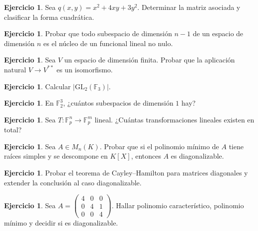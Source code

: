 \documentclass[10pt,a4paper,oneside]{article}
\theoremstyle{plain}
\theoremstyle{definition}
\newtheorem{exercise}[theorem]{Ejercicio}
\theoremstyle{remark}
\newcommand{\F}{\mathbb{F}}
\newcommand{\GL}{\mathrm{GL}}
\begin{document}
\begin{exercise}
Sea \(q(x,y)=x^2+4xy+3y^2\). Determinar la matriz asociada y clasificar la forma cuadrática.
\end{exercise}
\begin{exercise}
Probar que todo subespacio de dimensión \(n-1\) de un espacio de dimensión \(n\) es el núcleo de un funcional lineal no nulo.
\end{exercise}
\begin{exercise}
Sea \(V\) un espacio de dimensión finita. Probar que la aplicación natural \(V\to V^{**}\) es un isomorfismo.
\end{exercise}
\begin{exercise}
Calcular \(|\GL_2(\F_3)|\).
\end{exercise}
\begin{exercise}
En \(\F_2^3\), ¿cuántos subespacios de dimensión \(1\) hay?
\end{exercise}
\begin{exercise}
Sea \(T:\F_p^n\to\F_p^m\) lineal. ¿Cuántas transformaciones lineales existen en total?
\end{exercise}
\begin{exercise}
Sea \(A\in M_n(K)\). Probar que si el polinomio mínimo de \(A\) tiene raíces simples y se descompone en \(K[X]\), entonces \(A\) es diagonalizable.
\end{exercise}
\begin{exercise}
Probar el teorema de Cayley--Hamilton para matrices diagonales y extender la conclusión al caso diagonalizable.
\end{exercise}
\begin{exercise}
Sea \(A=\begin{pmatrix}4&0&0\\0&4&1\\0&0&4\end{pmatrix}\). Hallar polinomio característico, polinomio mínimo y decidir si es diagonalizable.
\end{exercise}
\end{document}
